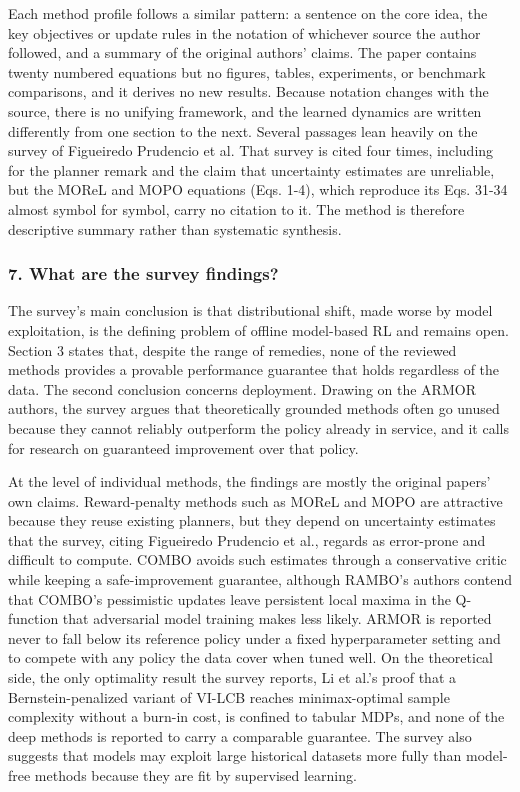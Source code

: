 \documentclass[11pt]{article}
\newcommand{\question}[1]{\subsubsection*{#1}}
\begin{document}
Each method profile follows a similar pattern: a sentence on the core idea, the key objectives or update rules in the notation of whichever source the author followed, and a summary of the original authors' claims. The paper contains twenty numbered equations but no figures, tables, experiments, or benchmark comparisons, and it derives no new results. Because notation changes with the source, there is no unifying framework, and the learned dynamics are written differently from one section to the next. Several passages lean heavily on the survey of Figueiredo Prudencio et al. That survey is cited four times, including for the planner remark and the claim that uncertainty estimates are unreliable, but the MOReL and MOPO equations (Eqs. 1-4), which reproduce its Eqs. 31-34 almost symbol for symbol, carry no citation to it. The method is therefore descriptive summary rather than systematic synthesis.

\question{7. What are the survey findings?}

The survey's main conclusion is that distributional shift, made worse by model exploitation, is the defining problem of offline model-based RL and remains open. Section 3 states that, despite the range of remedies, none of the reviewed methods provides a provable performance guarantee that holds regardless of the data. The second conclusion concerns deployment. Drawing on the ARMOR authors, the survey argues that theoretically grounded methods often go unused because they cannot reliably outperform the policy already in service, and it calls for research on guaranteed improvement over that policy.

At the level of individual methods, the findings are mostly the original papers' own claims. Reward-penalty methods such as MOReL and MOPO are attractive because they reuse existing planners, but they depend on uncertainty estimates that the survey, citing Figueiredo Prudencio et al., regards as error-prone and difficult to compute. COMBO avoids such estimates through a conservative critic while keeping a safe-improvement guarantee, although RAMBO's authors contend that COMBO's pessimistic updates leave persistent local maxima in the Q-function that adversarial model training makes less likely. ARMOR is reported never to fall below its reference policy under a fixed hyperparameter setting and to compete with any policy the data cover when tuned well. On the theoretical side, the only optimality result the survey reports, Li et al.'s proof that a Bernstein-penalized variant of VI-LCB reaches minimax-optimal sample complexity without a burn-in cost, is confined to tabular MDPs, and none of the deep methods is reported to carry a comparable guarantee. The survey also suggests that models may exploit large historical datasets more fully than model-free methods because they are fit by supervised learning.
\end{document}
